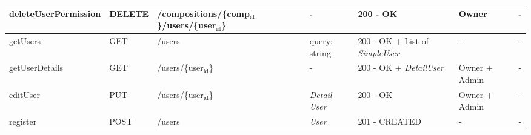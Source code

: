 \documentclass[11pt]{article}
\begin{document}
\begin{table}[htbp]
\begin{tabular}{lllllll}
deleteUserPermission & DELETE & /compositions/\{comp\(_{\text{id}}\)\}/users/\{user\(_{\text{id}}\)\} & - & 200 - OK & Owner & -\\
\hline
getUsers & GET & /users & query: string & 200 - OK + List of \emph{SimpleUser} & - & -\\
getUserDetails & GET & /users/\{user\(_{\text{id}}\)\} & - & 200 - OK + \emph{DetailUser} & Owner + Admin & -\\
editUser & PUT & /users/\{user\(_{\text{id}}\)\} & \emph{Detail User} & 200 - OK & Owner + Admin & -\\
register & POST & /users & \emph{User} & 201 - CREATED & - & -\\
\hline
\end{tabular}
\end{table}
\end{document}
